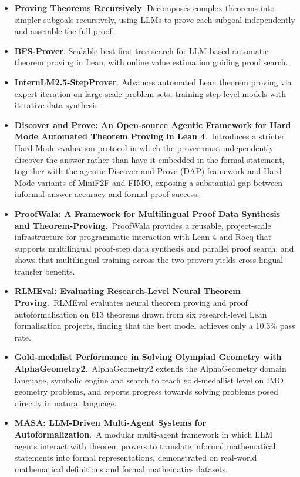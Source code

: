 \documentclass[natbib=false,acmsmall,nonacm,11pt]{acmart}
\begin{document}
\begin{itemize}
\item \textbf{Proving Theorems Recursively}. Decomposes complex theorems into simpler subgoals recursively, using LLMs to prove each subgoal independently and assemble the full proof.~\cite{DBLP:journals/corr/abs-2405-14414}
\item \textbf{BFS-Prover}. Scalable best-first tree search for LLM-based automatic theorem proving in Lean, with online value estimation guiding proof search.~\cite{DBLP:journals/corr/abs-2502-03438}
\item \textbf{InternLM2.5-StepProver}. Advances automated Lean theorem proving via expert iteration on large-scale problem sets, training step-level models with iterative data synthesis.~\cite{DBLP:journals/corr/abs-2410-15700}
\item \textbf{Discover and Prove: An Open-source Agentic Framework for Hard Mode Automated Theorem Proving in Lean 4}.~Introduces a stricter Hard Mode evaluation protocol in which the prover must independently discover the answer rather than have it embedded in the formal statement, together with the agentic Discover-and-Prove (DAP) framework and Hard Mode variants of MiniF2F and FIMO, exposing a substantial gap between informal answer accuracy and formal proof success.~\cite{liu-etal-2026-discover}
\item \textbf{ProofWala: A Framework for Multilingual Proof Data Synthesis and Theorem-Proving}.~ProofWala provides a reusable, project-scale infrastructure for programmatic interaction with Lean 4 and Rocq that supports multilingual proof-step data synthesis and parallel proof search, and shows that multilingual training across the two provers yields cross-lingual transfer benefits.~\cite{DBLP:conf/itp/ThakurTDC26}
\item \textbf{RLMEval: Evaluating Research-Level Neural Theorem Proving}.~RLMEval evaluates neural theorem proving and proof autoformalisation on 613 theorems drawn from six research-level Lean formalisation projects, finding that the best model achieves only a 10.3\% pass rate.~\cite{poiroux-etal-2025-rlmeval}
\item \textbf{Gold-medalist Performance in Solving Olympiad Geometry with AlphaGeometry2}.~AlphaGeometry2 extends the AlphaGeometry domain language, symbolic engine and search to reach gold-medallist level on IMO geometry problems, and reports progress towards solving problems posed directly in natural language.~\cite{JMLR:v26:25-1654}
\item \textbf{MASA: LLM-Driven Multi-Agent Systems for Autoformalization}.~A modular multi-agent framework in which LLM agents interact with theorem provers to translate informal mathematical statements into formal representations, demonstrated on real-world mathematical definitions and formal mathematics datasets.~\cite{zhang-etal-2025-masa}

\end{itemize}
\end{document}
